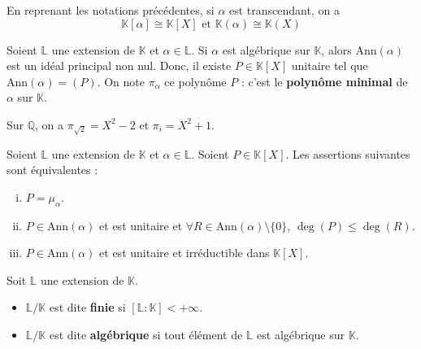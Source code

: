 	\begin{proposition}
		En reprenant les notations précédentes, si $\alpha$ est transcendant, on a
		\[ \mathbb{K}[\alpha] \cong \mathbb{K}[X] \text{ et } \mathbb{K}(\alpha) \cong \mathbb{K}(X) \]
	\end{proposition}

	\begin{definition}
		Soient $\mathbb{L}$ une extension de $\mathbb{K}$ et $\alpha \in \mathbb{L}$. Si $\alpha$ est algébrique sur $\mathbb{K}$, alors $\mathrm{Ann}(\alpha)$ est un idéal principal non nul. Donc, il existe $P \in \mathbb{K}[X]$ unitaire tel que $\mathrm{Ann}(\alpha) = (P)$. On note $\pi_\alpha$ ce polynôme $P$ : c'est le \textbf{polynôme minimal} de $\alpha$ sur $\mathbb{K}$.
	\end{definition}

	\begin{example}
		Sur $\mathbb{Q}$, on a $\pi_{\sqrt{2}} = X^2 - 2$ et $\pi_i = X^2 + 1$.
	\end{example}


	\begin{proposition}
		Soient $\mathbb{L}$ une extension de $\mathbb{K}$ et $\alpha \in \mathbb{L}$. Soient $P \in \mathbb{K}[X]$. Les assertions suivantes sont équivalentes :
		\begin{enumerate}[(i)]
			\item $P = \mu_\alpha$.
			\item $P \in \mathrm{Ann}(\alpha)$ et est unitaire et $\forall R \in \mathrm{Ann}(\alpha) \setminus \{ 0 \}, \, \deg(P) \leq \deg(R)$.
			\item $P \in \mathrm{Ann}(\alpha)$ et est unitaire et irréductible dans $\mathbb{K}[X]$.
		\end{enumerate}
	\end{proposition}


	\begin{definition}
		Soit $\mathbb{L}$ une extension de $\mathbb{K}$.
		\begin{itemize}
			\item $\mathbb{L}/\mathbb{K}$ est dite \textbf{finie} si $[\mathbb{L}:\mathbb{K}] < +\infty$.
			\item $\mathbb{L}/\mathbb{K}$ est dite \textbf{algébrique} si tout élément de $\mathbb{L}$ est algébrique sur $\mathbb{K}$.
		\end{itemize}
	\end{definition}

